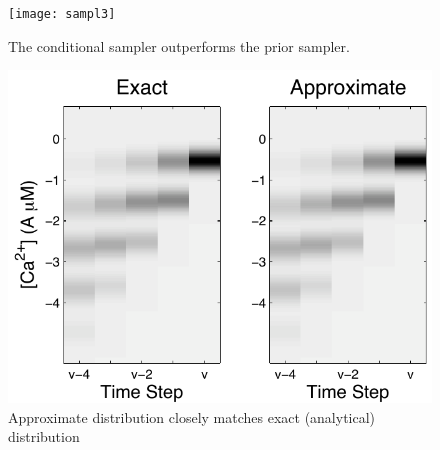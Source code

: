 \documentclass[12pt]{article}
\begin{document}
\clearpage \newpage
\begin{figure}
\centering \texttt{[image: sampl3]}
\caption{The conditional sampler outperforms the prior sampler.} \label{fig:sampl}
\end{figure}

\clearpage \newpage
\begin{figure}
\centering
\includegraphics[width=0.5\linewidth]{PFapprox2}
\caption{Approximate distribution closely matches exact (analytical) distribution} \label{fig:pf2}
\end{figure}
\end{document}
